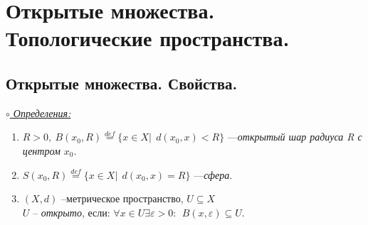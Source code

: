 \documentclass{article}
\begin{document}
\section{Открытые множества. Топологические пространства.}
\subsection{Открытые множества. Свойства.}
\underline{\textit{$\circ$ Определения:}}\\
\begin{enumerate}
\item $R>0,~B(x_{0}, R)\overset{def}{=}\lbrace x\in X|~~d(x_{0},x)<R\rbrace$ ---\emph{открытый шар радиуса R с центром $x_{0}$}.
\item $S(x_{0}, R)\overset{def}{=}\lbrace x\in X|~~d(x_{0}, x)=R\rbrace$ ---\emph{сфера}.
\item $(X, d)$ --метрическое пространство, $U\subseteq X$
\\$U$ -- \emph{открыто}, если:
\subitem $\forall x\in U \exists \varepsilon >0 :~~B(x, \varepsilon)\subseteq U.$
\end{enumerate}
\end{document}
